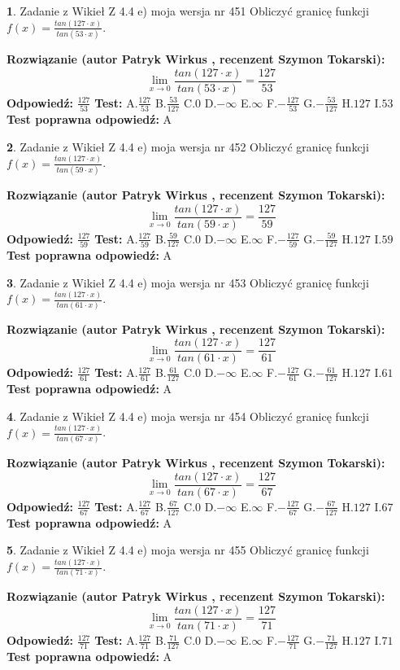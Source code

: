 \documentclass[12pt, a4paper]{article}
\theoremstyle{definition} %
\newtheorem{zad}{}
\newcommand{\zadStart}[1]{\begin{zad}#1\newline}
\newcommand{\zadStop}{\end{zad}}
\newcommand{\rozwStart}[2]{\noindent \textbf{Rozwiązanie (autor #1 , recenzent #2): }\newline}
\newcommand{\rozwStop}{\newline}
\newcommand{\odpStart}{\noindent \textbf{Odpowiedź:}\newline}
\newcommand{\odpStop}{\newline}
\newcommand{\testStart}{\noindent \textbf{Test:}\newline}
\newcommand{\testStop}{\newline}
\newcommand{\kluczStart}{\noindent \textbf{Test poprawna odpowiedź:}\newline}
\newcommand{\kluczStop}{\newline}
\begin{document}
\zadStart{Zadanie z Wikieł Z 4.4 e) moja wersja nr 451}
Obliczyć granicę funkcji $f(x)=\frac{tan(127\cdot x)}{tan(53\cdot x)}$.
\zadStop
\rozwStart{Patryk Wirkus}{Szymon Tokarski}
$$\lim\limits_{x\to 0}\frac{tan(127\cdot x)}{tan(53\cdot x)}=
\frac{127}{53}$$
\rozwStop
\odpStart
$\frac{127}{53}$
\odpStop
\testStart
A.$\frac{127}{53}$
B.$\frac{53}{127}$
C.$0$
D.$-\infty$
E.$\infty$
F.$-\frac{127}{53}$
G.$-\frac{53}{127}$
H.$127$
I.$53$
\testStop
\kluczStart
A
\kluczStop



\zadStart{Zadanie z Wikieł Z 4.4 e) moja wersja nr 452}
Obliczyć granicę funkcji $f(x)=\frac{tan(127\cdot x)}{tan(59\cdot x)}$.
\zadStop
\rozwStart{Patryk Wirkus}{Szymon Tokarski}
$$\lim\limits_{x\to 0}\frac{tan(127\cdot x)}{tan(59\cdot x)}=
\frac{127}{59}$$
\rozwStop
\odpStart
$\frac{127}{59}$
\odpStop
\testStart
A.$\frac{127}{59}$
B.$\frac{59}{127}$
C.$0$
D.$-\infty$
E.$\infty$
F.$-\frac{127}{59}$
G.$-\frac{59}{127}$
H.$127$
I.$59$
\testStop
\kluczStart
A
\kluczStop



\zadStart{Zadanie z Wikieł Z 4.4 e) moja wersja nr 453}
Obliczyć granicę funkcji $f(x)=\frac{tan(127\cdot x)}{tan(61\cdot x)}$.
\zadStop
\rozwStart{Patryk Wirkus}{Szymon Tokarski}
$$\lim\limits_{x\to 0}\frac{tan(127\cdot x)}{tan(61\cdot x)}=
\frac{127}{61}$$
\rozwStop
\odpStart
$\frac{127}{61}$
\odpStop
\testStart
A.$\frac{127}{61}$
B.$\frac{61}{127}$
C.$0$
D.$-\infty$
E.$\infty$
F.$-\frac{127}{61}$
G.$-\frac{61}{127}$
H.$127$
I.$61$
\testStop
\kluczStart
A
\kluczStop



\zadStart{Zadanie z Wikieł Z 4.4 e) moja wersja nr 454}
Obliczyć granicę funkcji $f(x)=\frac{tan(127\cdot x)}{tan(67\cdot x)}$.
\zadStop
\rozwStart{Patryk Wirkus}{Szymon Tokarski}
$$\lim\limits_{x\to 0}\frac{tan(127\cdot x)}{tan(67\cdot x)}=
\frac{127}{67}$$
\rozwStop
\odpStart
$\frac{127}{67}$
\odpStop
\testStart
A.$\frac{127}{67}$
B.$\frac{67}{127}$
C.$0$
D.$-\infty$
E.$\infty$
F.$-\frac{127}{67}$
G.$-\frac{67}{127}$
H.$127$
I.$67$
\testStop
\kluczStart
A
\kluczStop



\zadStart{Zadanie z Wikieł Z 4.4 e) moja wersja nr 455}
Obliczyć granicę funkcji $f(x)=\frac{tan(127\cdot x)}{tan(71\cdot x)}$.
\zadStop
\rozwStart{Patryk Wirkus}{Szymon Tokarski}
$$\lim\limits_{x\to 0}\frac{tan(127\cdot x)}{tan(71\cdot x)}=
\frac{127}{71}$$
\rozwStop
\odpStart
$\frac{127}{71}$
\odpStop
\testStart
A.$\frac{127}{71}$
B.$\frac{71}{127}$
C.$0$
D.$-\infty$
E.$\infty$
F.$-\frac{127}{71}$
G.$-\frac{71}{127}$
H.$127$
I.$71$
\testStop
\kluczStart
A
\kluczStop
\end{document}
